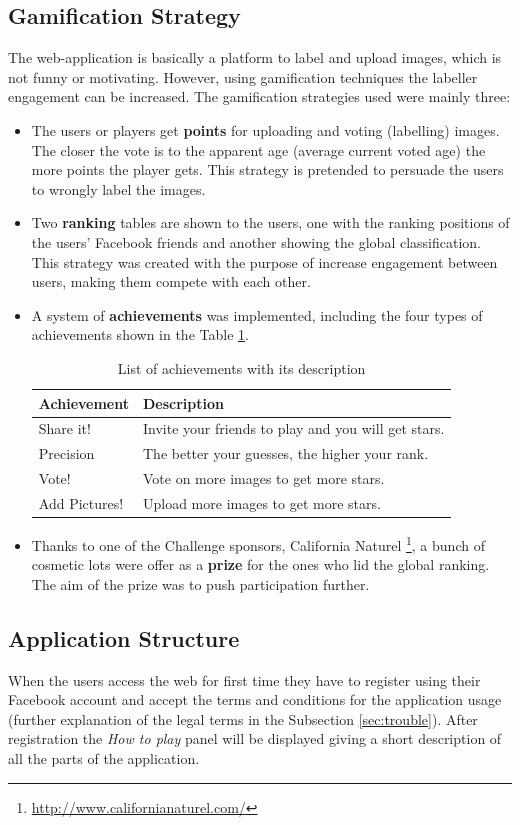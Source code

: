 \subsection{Gamification Strategy}
The web-application is basically a platform to label and upload images, which is not funny or motivating. However, using gamification techniques the labeller engagement can be increased. The gamification strategies used were mainly three:

\begin{itemize}
	\item The users or players get \textbf{points} for uploading and voting (labelling) images. The closer the vote is to the apparent age (average current voted age) the more points the player gets. This strategy is pretended to persuade the users to wrongly label the images.
	\item Two \textbf{ranking} tables are shown to the users, one with the ranking positions of the users' Facebook friends and another showing the global classification. This strategy was created with the purpose of increase engagement between users, making them compete with each other. 
	\item A system of \textbf{achievements} was implemented, including the four types of achievements shown in the Table \ref{tab:achiev}.
	\begin{table}[!h]
		\centering
		\begin{tabular}{l|l}
			\textbf{Achievement} & \textbf{Description} \\ \hline
			Share it! &	Invite your friends to play and you will get stars.	\\
			Precision &	The better your guesses, the higher your rank. \\
			Vote! &	Vote on more images to get more stars.\\	
			Add Pictures! &	Upload more images to get more stars. \\
		\end{tabular}
		\caption{List of achievements with its description}
		\label{tab:achiev}
	\end{table}
	\item Thanks to one of the Challenge sponsors, California Naturel \footnote{\url{http://www.californianaturel.com/}}, a bunch of cosmetic lots were offer as a \textbf{prize} for the ones who lid the global ranking. The aim of the prize was to push participation further.
\end{itemize}


\subsection{Application Structure}
When the users access the web for first time they have to register using their Facebook account and accept the terms and conditions for the application usage (further explanation of the legal terms in the Subsection \ref{sec:trouble}). After registration the \textit{How to play} panel will be displayed giving a short description of all the parts of the application.

